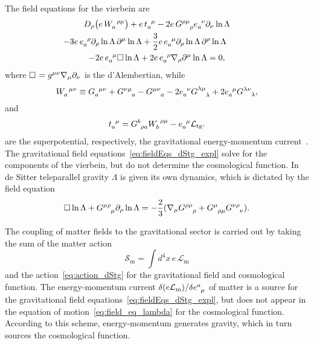 \documentclass[%
5p,
times,
sort&compress
]{elsarticle}
\newcommand{\ind}{\indices}
\def\pd{\partial}
\def\mc{\mathcal}
\def\mrm{\mathrm}
\begin{document}
The field equations for the vierbein are
\begin{multline}
\label{eq:fieldEqs_dStg_expl}
   D_\rho \big(e\, W\ind{_a^{\rho\mu}}\big) + e\, t\ind{_a^\mu} 
   - 2e\, G\ind{^{\rho\mu}_\rho} e\ind{_a^\nu} \pd_\nu \ln 
   \Lambda \\ - 3 e\, e\ind{_a^\rho} \pd_\rho \ln \Lambda\, 
   \pd^\mu \ln \Lambda
   + \frac{3}{2} e\, e\ind{_a^\mu} \pd_\rho \ln \Lambda\, 
   \pd^\rho \ln \Lambda \hspace{1cm}
   \\
   - 2e\, e\ind{_a^\mu} \Box \ln \Lambda + 2e\, e\ind{_a^\rho} 
   \nabla_\rho \pd^\mu \ln \Lambda = 0,
\end{multline}
where $\Box\hspace{0.1em} = g^{\mu\nu} \nabla_\mu \pd_\nu$ is the 
d'Alembertian, while
\begin{equation*}
  W\ind{_a^{\mu\nu}} \equiv G\ind{_a^{\mu\nu}} 
  + G\ind{^{\nu\mu}_a} - G\ind{^{\mu\nu}_a} \\
  - 2e\ind{_a^\nu} G\ind{^{\lambda\mu}_\lambda} + 2e\ind{_a^\mu} 
  G\ind{^{\lambda\nu}_\lambda},
\end{equation*}
and
\begin{equation*}
  t\ind{_a^\mu} = G\ind{^b_{\rho a}} W\ind{_b^{\rho\mu}} 
  - e\ind{_a^\mu} \mathcal{L}_\mrm{tg}.
\end{equation*}
are the superpotential, respectively, the gravitational 
energy-momentum current~\cite{Maluf:2013gaa}. The gravitational 
field equations~\eqref{eq:fieldEqs_dStg_expl} solve for the 
components of the vierbein, but do not determine the cosmological 
function. In de Sitter teleparallel gravity $\Lambda$ is given 
its own dynamics, which is dictated by the field equation
\begin{equation}
\label{eq:field_eq_lambda}
  \Box \ln \Lambda + G\ind{^{\mu\rho}_\mu} \pd_\rho \ln \Lambda =
  -\frac{2}{3} ( \nabla_\mu G\ind{^{\rho\mu}_\rho} 
  + G\ind{^\mu_{\rho\mu}} G\ind{^{\nu\rho}_\nu} ).
\end{equation}

The coupling of matter fields to the gravitational sector is 
carried out by taking the sum of the matter action
\begin{equation*}
  \mc{S}_\mrm{m} = \int d^4x \, e \, \mc{L}_\mrm{m}
\end{equation*}
and the action~\eqref{eq:action_dStg} for the gravitational field 
and cosmological function. The energy-momentum current $\delta (e 
\mc{L}_\mrm{m})/\delta e\ind{^a_\mu}$ of matter is a source for 
the gravitational field equations~\eqref{eq:fieldEqs_dStg_expl}, 
but does not appear in the equation of 
motion~\eqref{eq:field_eq_lambda} for the cosmological function.  
According to this scheme, energy-momentum generates gravity, 
which in turn sources the cosmological function.
\end{document}
